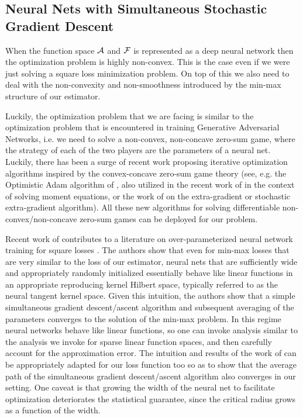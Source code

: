 \subsection{Neural Nets with Simultaneous Stochastic Gradient Descent}

When the function space ${\mathcal A}$ and ${\mathcal F}$ is represented as a deep neural network then the optimization problem is highly non-convex. This is the case even if we were just solving a square loss minimization problem. On top of this we also need to deal with the non-convexity and non-smoothness introduced by the min-max structure of our estimator. 

Luckily, the optimization problem that we are facing is similar to the optimization problem that is encountered in training Generative Adversarial Networks, i.e. we need to solve a non-convex, non-concave zero-sum game, where the strategy of each of the two players are the parameters of a neural net. Luckily, there has been a surge of recent work proposing iterative optimization algorithms inspired by the convex-concave zero-sum game theory (see, e.g. the Optimistic Adam algorithm of \cite{Daskalakis2017}, also utilized in the recent work of \cite{bennett2019deep,dikkala2020minimax} in the context of solving moment equations, or the work of \cite{Hsieh2019,Mishchenko2019} on the extra-gradient or stochastic extra-gradient algorithm). All these new algorithms for solving differentiable non-convex/non-concave zero-sum games can be deployed for our problem.

Recent work of \cite{liao2020provably} contributes to a literature on over-parameterized neural network training for square losses \cite{AllenZhu2018,du2018gradient,Soltanolkotabi2019}. The authors show that even for min-max losses that are very similar to the loss of our estimator, neural nets that are sufficiently wide and appropriately randomly initialized essentially behave like linear functions in an appropriate reproducing kernel Hilbert space, typically referred to as the neural tangent kernel space. Given this intuition, the authors show that a simple simultaneous gradient descent/ascent algorithm and subsequent averaging of the parameters converges to the solution of the min-max problem. In this regime neural networks behave like linear functions, so one can invoke analysis similar to the analysis we invoke for sparse linear function spaces, and then carefully account for the approximation error. The intuition and results of the work of \cite{liao2020provably} can be appropriately adapted for our loss function too so as to show that the average path of the simultaneous gradient descent/ascent algorithm also converges in our setting. One caveat is that growing the width of the neural net to facilitate optimization deteriorates the statistical guarantee, since the critical radius grows as a function of the width.

